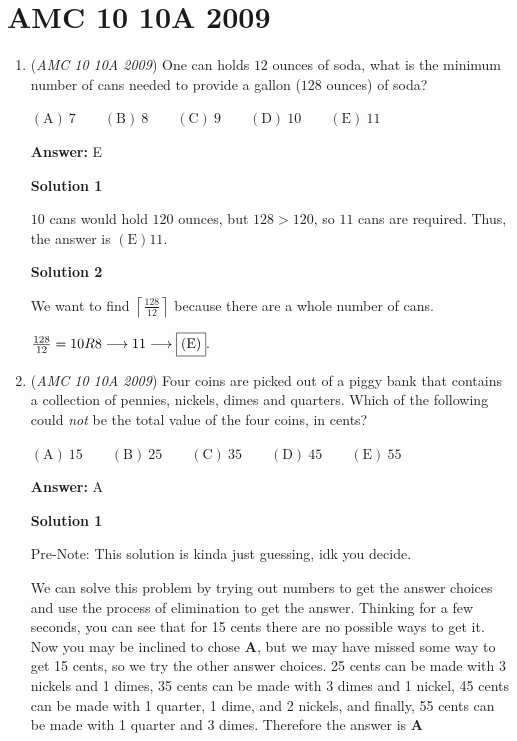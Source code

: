 \section{AMC 10 10A 2009}
        \begin{enumerate}
        	\item (\textit{AMC 10 10A 2009}) One can holds $12$ ounces of soda, what is the minimum number of cans needed to provide a gallon ($128$ ounces) of soda?


 $\mathrm{(A)}\ 7 \qquad \mathrm{(B)}\ 8 \qquad \mathrm{(C)}\ 9 \qquad \mathrm{(D)}\ 10 \qquad \mathrm{(E)}\ 11$

 \textbf{Answer: }E



\textbf{Solution 1}

$10$ cans would hold $120$ ounces, but $128>120$, so $11$ cans are required. Thus, the answer is $\mathrm{\boxed{{(E)}11}}$.

 



\textbf{Solution 2}

We want to find $\left\lceil\frac{128}{12}\right\rceil$ because there are a whole number of cans.

 $\frac{128}{12} = 10R8\longrightarrow 11\longrightarrow \fbox{(E)}.$



	\item (\textit{AMC 10 10A 2009}) Four coins are picked out of a  piggy bank that contains a collection of pennies, nickels, dimes and quarters. Which of the following could \textit{not} be the total value of the four coins, in cents?


 $\mathrm{(A)}\ 15 \qquad \mathrm{(B)}\ 25 \qquad \mathrm{(C)}\ 35 \qquad \mathrm{(D)}\ 45 \qquad \mathrm{(E)}\ 55$

 \textbf{Answer: }A



\textbf{Solution 1}

Pre-Note: This solution is kinda just guessing, idk you decide.

 We can solve this problem by trying out numbers to get the answer choices and use the process of elimination to get the answer. Thinking for a few seconds, you can see that for 15 cents there are no possible ways to get it. Now you may be inclined to chose $\textbf{A}$, but we may have missed some way to get 15 cents, so we try the other answer choices. 25 cents can be made with 3 nickels and 1 dimes, 35 cents can be made with 3 dimes and 1 nickel, 45 cents can be made with 1 quarter, 1 dime, and 2 nickels, and finally, 55 cents can be made with 1 quarter and 3 dimes. Therefore the answer is $\boxed{\textbf{A}}$


\end{enumerate}
